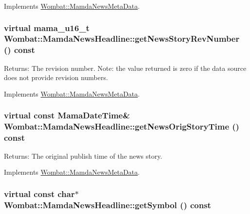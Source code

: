 Implements \hyperlink{classWombat_1_1MamdaNewsMetaData_1d004d2cccd57b8cdb88bc0bae62d685}{Wombat::Mamda\-News\-Meta\-Data}.\hypertarget{classWombat_1_1MamdaNewsHeadline_75fde990077f814ccc4fb601de8a6d20}{
\subsubsection[getNewsStoryRevNumber]{\setlength{\rightskip}{0pt plus 5cm}virtual mama\_\-u16\_\-t Wombat::Mamda\-News\-Headline::get\-News\-Story\-Rev\-Number () const}}
\label{classWombat_1_1MamdaNewsHeadline_75fde990077f814ccc4fb601de8a6d20}


\begin{Desc}
\item[Returns:]The revision number. Note: the value returned is zero if the data source does not provide revision numbers. \end{Desc}


Implements \hyperlink{classWombat_1_1MamdaNewsMetaData_58b2e7b0cdd5e496b54df349b3b65676}{Wombat::Mamda\-News\-Meta\-Data}.\hypertarget{classWombat_1_1MamdaNewsHeadline_a61ffab170f414fe6ffc986aec9c5ddb}{
\subsubsection[getNewsOrigStoryTime]{\setlength{\rightskip}{0pt plus 5cm}virtual const Mama\-Date\-Time\& Wombat::Mamda\-News\-Headline::get\-News\-Orig\-Story\-Time () const}}
\label{classWombat_1_1MamdaNewsHeadline_a61ffab170f414fe6ffc986aec9c5ddb}


\begin{Desc}
\item[Returns:]The original publish time of the news story. \end{Desc}


Implements \hyperlink{classWombat_1_1MamdaNewsMetaData_2102fe268a03b09d9e899e9f7935949c}{Wombat::Mamda\-News\-Meta\-Data}.\hypertarget{classWombat_1_1MamdaNewsHeadline_cad33340ee13c4bdcf9de234be19b0a5}{
\subsubsection[getSymbol]{\setlength{\rightskip}{0pt plus 5cm}virtual const char$\ast$ Wombat::Mamda\-News\-Headline::get\-Symbol () const}}
\label{classWombat_1_1MamdaNewsHeadline_cad33340ee13c4bdcf9de234be19b0a5}


